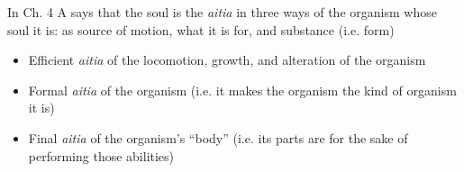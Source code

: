 \documentclass[11pt]{article}
\begin{document}
\noindent In Ch. 4 A says that the soul is the \emph{aitia} in three ways of the organism whose soul it is: as source of motion, what it is for, and substance (i.e. form)
\begin{itemize}
\item Efficient \emph{aitia} of the locomotion, growth, and alteration of the organism

\item Formal \emph{aitia} of the organism (i.e. it makes the organism the kind of organism it is)

\item Final \emph{aitia} of the organism's ``body'' (i.e. its parts are for the sake of performing those abilities)
\end{itemize}
\end{document}
